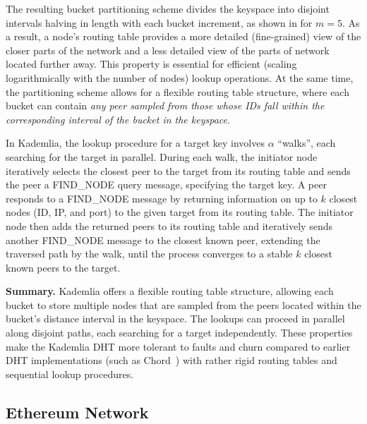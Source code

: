 The resulting bucket partitioning scheme divides the keyspace into disjoint intervals halving in length with each bucket increment, as shown in  for $m=5$. As a result, a node's routing table provides a more detailed (\ie fine-grained) view of the closer parts of the network and a less detailed view of the parts of network located further away. This property is essential for efficient (\ie scaling logarithmically with the number of nodes) lookup operations. At the same time, the partitioning scheme allows for a flexible routing table structure, where each bucket can contain \textit{any peer sampled from those whose IDs fall within the corresponding interval of the bucket in the keyspace}.

In Kademlia, the lookup procedure for a target key involves $\alpha$ ``walks'', each searching for the target in parallel. During each walk, the initiator node iteratively selects the closest peer to the target from its routing table and sends the peer a FIND\_NODE query message, specifying the target key. A peer responds to a FIND\_NODE message by returning information on up to $k$ closest nodes (\ie ID, IP, and port) to the given target from its routing table. The initiator node then adds the returned peers to its routing table and iteratively sends another FIND\_NODE message to the closest known peer, extending the traversed path by the walk, until the process converges to a stable $k$ closest known peers to the target. %

\textbf{Summary.} Kademlia offers a flexible routing table structure, allowing each bucket to store multiple nodes that are sampled from the peers located within the bucket's distance interval in the keyspace. The lookups can proceed in parallel along disjoint paths, each searching for a target independently. These properties make the Kademlia DHT more tolerant to faults and churn compared to earlier DHT implementations (such as Chord~\cite{chord}) with rather rigid routing tables and sequential lookup procedures.

\subsection{Ethereum Network}
\label{sec:eth-net}

